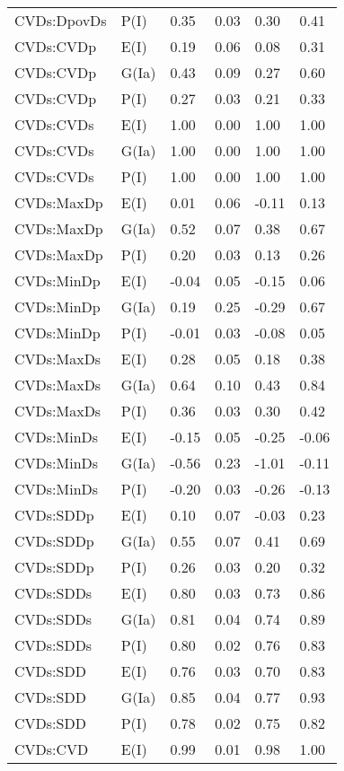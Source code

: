 \begin{center}
\begin{longtable}{|p{1.1in}|p{0.7in}|p{0.7in}|p{0.6in}|p{0.6in}|p{0.6in}|}
  CVDs:DpovDs & P(I) & 0.35 & 0.03 & 0.30 & 0.41 \\ 
  CVDs:CVDp & E(I) & 0.19 & 0.06 & 0.08 & 0.31 \\ 
  CVDs:CVDp & G(Ia) & 0.43 & 0.09 & 0.27 & 0.60 \\ 
  CVDs:CVDp & P(I) & 0.27 & 0.03 & 0.21 & 0.33 \\ 
  CVDs:CVDs & E(I) & 1.00 & 0.00 & 1.00 & 1.00 \\ 
  CVDs:CVDs & G(Ia) & 1.00 & 0.00 & 1.00 & 1.00 \\ 
  CVDs:CVDs & P(I) & 1.00 & 0.00 & 1.00 & 1.00 \\ 
  CVDs:MaxDp & E(I) & 0.01 & 0.06 & -0.11 & 0.13 \\ 
  CVDs:MaxDp & G(Ia) & 0.52 & 0.07 & 0.38 & 0.67 \\ 
  CVDs:MaxDp & P(I) & 0.20 & 0.03 & 0.13 & 0.26 \\ 
  CVDs:MinDp & E(I) & -0.04 & 0.05 & -0.15 & 0.06 \\ 
  CVDs:MinDp & G(Ia) & 0.19 & 0.25 & -0.29 & 0.67 \\ 
  CVDs:MinDp & P(I) & -0.01 & 0.03 & -0.08 & 0.05 \\ 
  CVDs:MaxDs & E(I) & 0.28 & 0.05 & 0.18 & 0.38 \\ 
  CVDs:MaxDs & G(Ia) & 0.64 & 0.10 & 0.43 & 0.84 \\ 
  CVDs:MaxDs & P(I) & 0.36 & 0.03 & 0.30 & 0.42 \\ 
  CVDs:MinDs & E(I) & -0.15 & 0.05 & -0.25 & -0.06 \\ 
  CVDs:MinDs & G(Ia) & -0.56 & 0.23 & -1.01 & -0.11 \\ 
  CVDs:MinDs & P(I) & -0.20 & 0.03 & -0.26 & -0.13 \\ 
  CVDs:SDDp & E(I) & 0.10 & 0.07 & -0.03 & 0.23 \\ 
  CVDs:SDDp & G(Ia) & 0.55 & 0.07 & 0.41 & 0.69 \\ 
  CVDs:SDDp & P(I) & 0.26 & 0.03 & 0.20 & 0.32 \\ 
  CVDs:SDDs & E(I) & 0.80 & 0.03 & 0.73 & 0.86 \\ 
  CVDs:SDDs & G(Ia) & 0.81 & 0.04 & 0.74 & 0.89 \\ 
  CVDs:SDDs & P(I) & 0.80 & 0.02 & 0.76 & 0.83 \\ 
  CVDs:SDD & E(I) & 0.76 & 0.03 & 0.70 & 0.83 \\ 
  CVDs:SDD & G(Ia) & 0.85 & 0.04 & 0.77 & 0.93 \\ 
  CVDs:SDD & P(I) & 0.78 & 0.02 & 0.75 & 0.82 \\ 
  CVDs:CVD & E(I) & 0.99 & 0.01 & 0.98 & 1.00 \\ 

\end{longtable}
\end{center}
